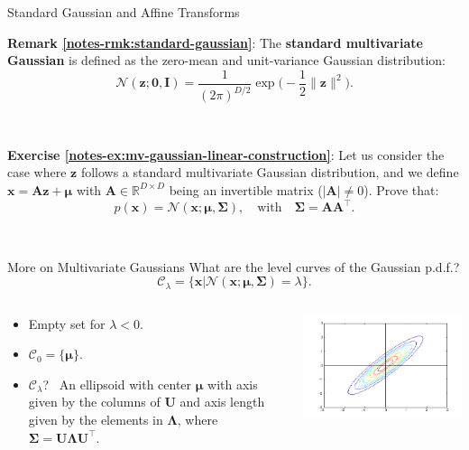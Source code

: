 \documentclass{beamer}
\newcommand{\bs}[1]{\boldsymbol{#1}}
\newcommand{\exercise}[2]{\noindent\colorbox{blue!10}{\parbox{0.995\textwidth}{\textbf{Exercise \ref{notes-ex:#1}}: #2}}\\}
\newcommand{\remark}[2]{\noindent\colorbox{red!10}{\parbox{0.995\textwidth}{\textbf{Remark \ref{notes-rmk:#1}}: #2}}\\}
\begin{document}
\begin{frame}{Standard Gaussian and Affine Transforms}
 \remark{standard-gaussian}{The \textbf{standard multivariate Gaussian} is defined as the zero-mean and unit-variance Gaussian distribution:
\[
 \mathcal{N}(\mathbf{z};\mathbf{0},\mathbf{I}) = \frac{1}{(2\pi)^{D/2}}\exp\Big(-\frac{1}{2}\|\mathbf{z}\|^2\Big).
\]
}\vspace{2mm}

\exercise{mv-gaussian-linear-construction}{Let us consider the case where $\mathbf{z}$ follows a standard multivariate Gaussian distribution, and we define $\mathbf{x}=\mathbf{A}\mathbf{z}+\bs{\mu}$ with $\mathbf{A}\in\mathbb{R}^{D\times D}$ being an invertible matrix ($|\mathbf{A}|\neq 0$). Prove that:
\[
 p(\mathbf{x}) = \mathcal{N}(\bs{x};\bs{\mu},\bs{\Sigma}), \quad \text{with} \quad \bs{\Sigma} = \mathbf{A}\mathbf{A}^\top.
\]
}
\end{frame}

\begin{frame}{More on Multivariate Gaussians}
    What are the level curves of the Gaussian p.d.f.?
    \[\mathcal{C}_\lambda = \{\bs{x}|\mathcal{N}(\bs{x};\bs{\mu},\bs{\Sigma})=\lambda\}.\]
    \pause
    \begin{columns}
     \begin{column}{0.5\textwidth}
     \small
    \begin{itemize}
     \item Empty set for $\lambda<0$.
     \item $\mathcal{C}_0=\{\bs{\mu}\}$.
     \item $\mathcal{C}_\lambda$? \pause\ An ellipsoid with center $\bs{\mu}$ with axis given by the columns of $\bs{U}$ and axis length given by the elements in $\bs{\Lambda}$, where $\bs{\Sigma}=\bs{U}\bs{\Lambda}\bs{U}^\top$.
    \end{itemize}
     \end{column}
     \begin{column}{0.5\textwidth}
      \centering
      \includegraphics[width=\textwidth]{fig/ellipsoids.png}
     \end{column}

    \end{columns}

\end{frame}
\end{document}
